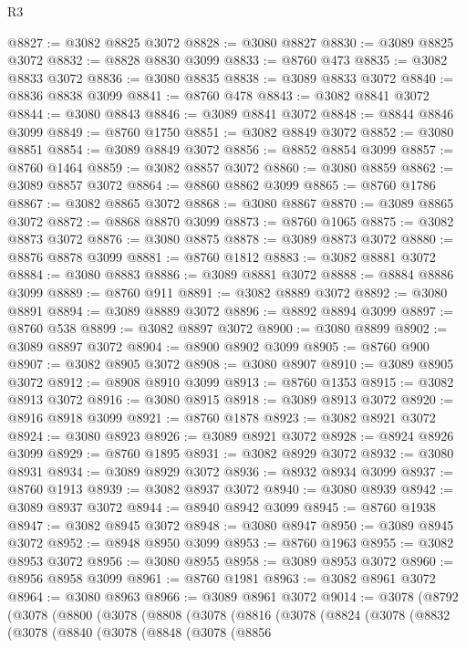 \begin{lexlean}{R3}
\begin{coremodule}
@8827 := @3082 @8825 @3072
@8828 := @3080 @8827
@8830 := @3089 @8825 @3072
@8832 := @8828 @8830 @3099
@8833 := @8760 @473
@8835 := @3082 @8833 @3072
@8836 := @3080 @8835
@8838 := @3089 @8833 @3072
@8840 := @8836 @8838 @3099
@8841 := @8760 @478
@8843 := @3082 @8841 @3072
@8844 := @3080 @8843
@8846 := @3089 @8841 @3072
@8848 := @8844 @8846 @3099
@8849 := @8760 @1750
@8851 := @3082 @8849 @3072
@8852 := @3080 @8851
@8854 := @3089 @8849 @3072
@8856 := @8852 @8854 @3099
@8857 := @8760 @1464
@8859 := @3082 @8857 @3072
@8860 := @3080 @8859
@8862 := @3089 @8857 @3072
@8864 := @8860 @8862 @3099
@8865 := @8760 @1786
@8867 := @3082 @8865 @3072
@8868 := @3080 @8867
@8870 := @3089 @8865 @3072
@8872 := @8868 @8870 @3099
@8873 := @8760 @1065
@8875 := @3082 @8873 @3072
@8876 := @3080 @8875
@8878 := @3089 @8873 @3072
@8880 := @8876 @8878 @3099
@8881 := @8760 @1812
@8883 := @3082 @8881 @3072
@8884 := @3080 @8883
@8886 := @3089 @8881 @3072
@8888 := @8884 @8886 @3099
@8889 := @8760 @911
@8891 := @3082 @8889 @3072
@8892 := @3080 @8891
@8894 := @3089 @8889 @3072
@8896 := @8892 @8894 @3099
@8897 := @8760 @538
@8899 := @3082 @8897 @3072
@8900 := @3080 @8899
@8902 := @3089 @8897 @3072
@8904 := @8900 @8902 @3099
@8905 := @8760 @900
@8907 := @3082 @8905 @3072
@8908 := @3080 @8907
@8910 := @3089 @8905 @3072
@8912 := @8908 @8910 @3099
@8913 := @8760 @1353
@8915 := @3082 @8913 @3072
@8916 := @3080 @8915
@8918 := @3089 @8913 @3072
@8920 := @8916 @8918 @3099
@8921 := @8760 @1878
@8923 := @3082 @8921 @3072
@8924 := @3080 @8923
@8926 := @3089 @8921 @3072
@8928 := @8924 @8926 @3099
@8929 := @8760 @1895
@8931 := @3082 @8929 @3072
@8932 := @3080 @8931
@8934 := @3089 @8929 @3072
@8936 := @8932 @8934 @3099
@8937 := @8760 @1913
@8939 := @3082 @8937 @3072
@8940 := @3080 @8939
@8942 := @3089 @8937 @3072
@8944 := @8940 @8942 @3099
@8945 := @8760 @1938
@8947 := @3082 @8945 @3072
@8948 := @3080 @8947
@8950 := @3089 @8945 @3072
@8952 := @8948 @8950 @3099
@8953 := @8760 @1963
@8955 := @3082 @8953 @3072
@8956 := @3080 @8955
@8958 := @3089 @8953 @3072
@8960 := @8956 @8958 @3099
@8961 := @8760 @1981
@8963 := @3082 @8961 @3072
@8964 := @3080 @8963
@8966 := @3089 @8961 @3072
@9014 := @3078
    (@8792
      (@3078
        (@8800
          (@3078
            (@8808
              (@3078
                (@8816
                  (@3078
                    (@8824
                      (@3078
                        (@8832
                          (@3078
                            (@8840
                              (@3078
                                (@8848
                                  (@3078
                                    (@8856

\end{coremodule}
\end{lexlean}
